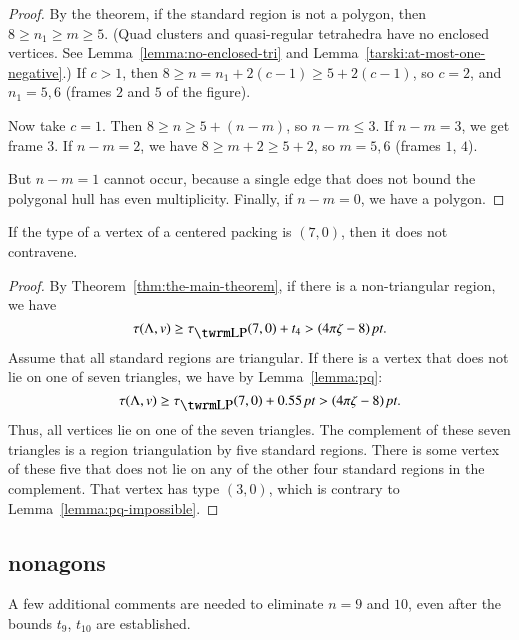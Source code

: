 \begin{proof}
By the theorem, if the standard region is not a polygon, then $8\ge
n_1\ge m\ge 5$. (Quad clusters and quasi-regular tetrahedra have no
enclosed vertices. See Lemma~\ref{lemma:no-enclosed-tri} and
Lemma~\ref{tarski:at-most-one-negative}.) If $c>1$, then $8\ge
n=n_1+2(c-1)\ge 5+2(c-1)$, so $c=2$, and $n_1=5,6$ (frames $2$ and $5$
of the figure).

Now take $c=1$.    Then $8\ge n\ge 5+(n-m)$, so $n-m\le 3$.  If $n-m=3$,
we get frame $3$. If $n-m=2$, we have $8\ge m+2\ge 5+2$, so $m=5,6$
(frames $1$, $4$).

But $n-m=1$ cannot occur, because a single edge that does not bound the
polygonal hull has even multiplicity.  Finally, if $n-m=0$, we have a
polygon.
\end{proof}

\begin{corollary} \label{lemma:70}
If the type of a vertex of a centered packing is $(7,0)$, then it
does not contravene.
\end{corollary}

\begin{proof} By Theorem~\ref{thm:the-main-theorem},
if there is a non-triangular region, we have
    $$\tau(\Lambda,v)\ge\tlp(7,0)+t_4>\squander.$$
Assume that all standard regions are triangular.  If there is a
vertex that does not lie on one of seven triangles, we have by
Lemma~\ref{lemma:pq}:
    $$\tau(\Lambda,v)\ge\tlp(7,0)+0.55\,\pt>\squander.$$
Thus, all vertices lie on one of the seven triangles.  The
complement of these seven triangles is a region triangulation by
five standard regions.  There is some vertex of these five that does
not lie on any of the other four standard regions in the complement.
That vertex has type $(3,0)$, which is contrary to
Lemma~\ref{lemma:pq-impossible}.
\end{proof}

\subsection{nonagons} %
    \label{sec:nonagon}

A few additional comments are needed to eliminate $n=9$ and $10$,
even after the bounds $t_9$, $t_{10}$ are established.

